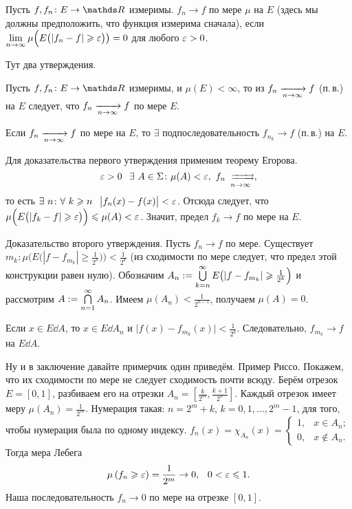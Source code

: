\begin{Def}
  Пусть $f,f_n\colon E\to \R$ измеримы. $f_n\to f$ по мере $\mu$ на $E$ (здесь мы должны предположить, что функция измерима\ldotst{} сначала), если $\lim\limits_{n\rightarrow\infty}\mu\Big(E\big(|f_n-f|\geqslant\varepsilon\big)\big)=0$ для любого $\varepsilon>0$.
\end{Def}

\begin{The}
 Тут два утверждения.
 \begin{roItems}
 \item Пусть $f,f_n\colon E\to \R$ измеримы, и $\mu (E)<\infty$, то из $f_n\xrightarrow[n\rightarrow\infty]{} f$ (п.\,в.) на $E$ следует, что $f_n\xrightarrow[n\rightarrow\infty]{} f $ по мере $E$.
 \item Если $f_n\xrightarrow[n\rightarrow\infty]{} f$ по мере на $E$, то $\exists$ подпоследовательность $f_{n_k}\to f$ (п.\,в.) на $E$.
 \end{roItems}
\end{The}

\begin{Proof}
 Для доказательства первого утверждения применим теорему Егорова. 
\[\e>0\pau \exists\ A\in\Sigma\colon \mu(A)<\e,\ f_n\rsh[]n,\]
то есть $\exists\ n\colon \forall\ k\ge n\pau \big|f_n(x)-f(x)\big|<\e$. Отсюда следует, что $\mu\Big(E\big(|f_k-f|\geqslant \varepsilon\big)\Big)\leqslant \mu(A)<\varepsilon$. Значит, предел  $f_k\to f$ по мере на $E$.

Доказательство второго утверждения. Пусть $f_n\to f$ по мере. Существует $m_k\colon \mu\Big(E\big(|f-f_{m_k}|\ge \frac1{2^k}\big)\Big)<\frac1{2^k}$ (из сходимости по мере следует, что предел этой конструкции равен нулю). Обозначим $A_n := \bigcup\limits_{k=n}^\infty E\big(|f-f_{m_k}|\geqslant \frac1{2^k}\Big)$ и рассмотрим $A:=\bigcap\limits_{n=1}^\infty A_n$. Имеем $\mu(A_n)<\frac1{2^{n-1}}$, получаем $\mu(A)=0$.

Если $x\in E\dd A$, то $x\in E\dd A_n$ и $\big|f(x)-f_{m_k}(x)\big|<\frac1{2^k}$. Следовательно, $f_{m_k}\to f$ на $E\dd A$.
\end{Proof}

Ну и в заключение давайте примерчик один приведём. Пример Риссо. Покажем, что их сходимости по мере не следует сходимость почти всюду. Берём отрезок $E=[0,1]$, разбиваем его на отрезки $A_n=\left[\frac{k}{2^m},\frac{k+1}{2^n}\right]$. Каждый отрезок имеет меру $\mu(A_n) = \frac{1}{2^m}$. Нумерация такая: $n=2^m+k$, $k=0,1,\dots,2^m-1$, для того, чтобы нумерация была по одному индексу. $f_n(x) = \chi_{A_n}(x) = \begin{cases}1,&x\in A_n;\\0,&x\not\in A_n.\end{cases}$ Тогда мера Лебега
\[\mu\left( f_n\ge \e\right) = \frac1{2^m}\to 0,\pau 0<\e\le 1.\]
Наша последовательность $f_n\to 0$ по мере на отрезке $[0,1]$.

